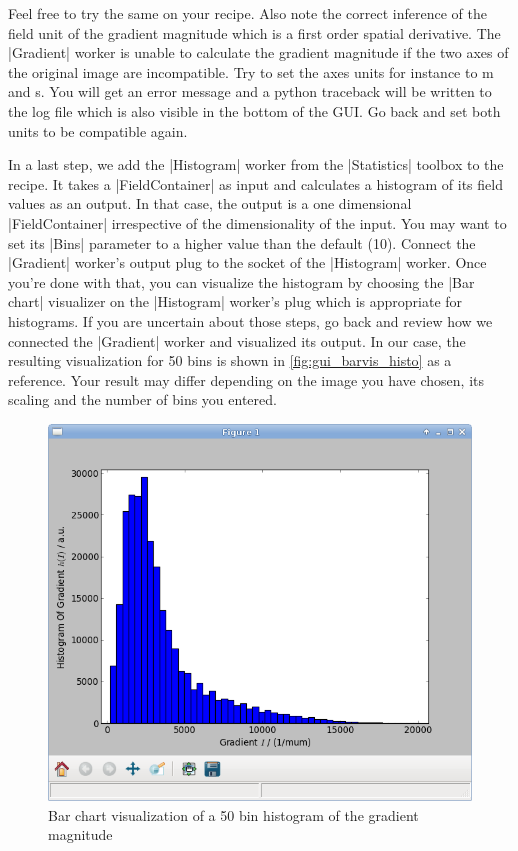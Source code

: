\documentclass[a4paper]{article}
\begin{document}
Feel free to try the same on your recipe. Also note the correct
inference of the field unit of the gradient magnitude which is a first
order spatial derivative. The |Gradient| worker is unable to calculate
the gradient magnitude if the two axes of the original image are
incompatible. Try to set the axes units for instance to \si{m} and
\si{s}. You will get an error message and a python traceback will be
written to the log file which is also visible in the bottom of the
GUI. Go back and set both units to be compatible again.

In a last step, we add the |Histogram| worker from the |Statistics|
toolbox to the recipe. It takes a |FieldContainer| as input and
calculates a histogram of its field values as an output. In that case,
the output is a one dimensional |FieldContainer| irrespective of the
dimensionality of the input. You may want to set its |Bins| parameter
to a higher value than the default (10). Connect the |Gradient|
worker's output plug to the socket of the |Histogram| worker. Once
you're done with that, you can visualize the histogram by choosing the
|Bar chart| visualizer on the |Histogram| worker's plug which is
appropriate for histograms. If you are uncertain about those steps, go
back and review how we connected the |Gradient| worker and visualized
its output. In our case, the resulting visualization for 50 bins is
shown in \autoref{fig:gui_barvis_histo} as a reference. Your result
may differ depending on the image you have chosen, its scaling and the
number of bins you entered.
\begin{figure}[h]
  \centering
  \includegraphics[scale=0.75]{fig/gui_barvis_histo.png}
  \caption{Bar chart visualization of a 50 bin histogram of the
    gradient magnitude}
  \label{fig:gui_barvis_histo}
\end{figure}
\end{document}
